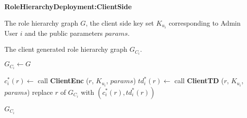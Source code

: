 \documentclass[final,5p,times,twocolumn]{elsarticle}
\newcommand{\algofontsize}{\fontsize{7}{8}\selectfont}
\begin{document}
\begin{algorithm}[htp]
{\algofontsize
\caption{\textbf{RoleHierarchyDeployment:ClientSide}}

\label{algo:deploy-role-hierarchy-client-side}

\begin{algorithmic}[1]

\REQUIRE The role hierarchy graph $G$, the client side key set $K_{u_i}$ corresponding to Admin User $i$ and the public parameters $params$.

\ENSURE The client generated role hierarchy graph $G_{C_i}$.

\medskip

\STATE $G_{C_i} \leftarrow G$ \label{line:deploy-rh-cs-copy}

 \label{line:deploy-rh-cs-loop}

	\STATE $c^*_i (r) \leftarrow$ call \textbf{ClientEnc} ($r$, $K_{u_i}$, $params$) \label{line:deploy-rh-cs-enc}
	\STATE $td^*_i (r) \leftarrow$ call \textbf{ClientTD} ($r$, $K_{u_i}$, $params$) {\algofontsize {}} \label{line:deploy-rh-cs-td}
	\STATE replace $r$ of $G_{C_i}$ with $(c^*_i (r), td^*_i (r))$ \label{line:deploy-rh-cs-replace}

\ENDFOR

\RETURN $G_{C_i}$

\end{algorithmic}
}
\end{algorithm}
\end{document}
